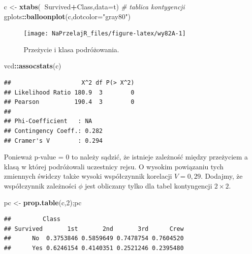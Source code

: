 \documentclass[polish,]{book}
\newenvironment{Shaded}{\begin{snugshade}}{\end{snugshade}}
\newcommand{\CommentTok}[1]{\textcolor[rgb]{0.56,0.35,0.01}{\textit{#1}}}
\newcommand{\DataTypeTok}[1]{\textcolor[rgb]{0.13,0.29,0.53}{#1}}
\newcommand{\DecValTok}[1]{\textcolor[rgb]{0.00,0.00,0.81}{#1}}
\newcommand{\KeywordTok}[1]{\textcolor[rgb]{0.13,0.29,0.53}{\textbf{#1}}}
\newcommand{\NormalTok}[1]{#1}
\newcommand{\OperatorTok}[1]{\textcolor[rgb]{0.81,0.36,0.00}{\textbf{#1}}}
\newcommand{\StringTok}[1]{\textcolor[rgb]{0.31,0.60,0.02}{#1}}
\begin{document}
\begin{Shaded}
\begin{Highlighting}[]
\NormalTok{c <-}\StringTok{ }\KeywordTok{xtabs}\NormalTok{(}\OperatorTok{~}\NormalTok{Survived}\OperatorTok{+}\NormalTok{Class,}\DataTypeTok{data=}\NormalTok{t) }\CommentTok{# tablica kontygencji}
\NormalTok{gplots}\OperatorTok{::}\KeywordTok{balloonplot}\NormalTok{(c,}\DataTypeTok{dotcolor=}\StringTok{"gray80"}\NormalTok{)}
\end{Highlighting}
\end{Shaded}

\begin{figure}[h]

{\centering \texttt{[image: NaPrzelajR\_files/figure-latex/wy82A-1]} 

}

\caption{Przeżycie i klasa podróżowania.}\label{fig:wy82A}
\end{figure}

\begin{Shaded}
\begin{Highlighting}[]
\NormalTok{vcd}\OperatorTok{::}\KeywordTok{assocstats}\NormalTok{(c)}
\end{Highlighting}
\end{Shaded}

\begin{verbatim}
##                    X^2 df P(> X^2)
## Likelihood Ratio 180.9  3        0
## Pearson          190.4  3        0
## 
## Phi-Coefficient   : NA 
## Contingency Coeff.: 0.282 
## Cramer's V        : 0.294
\end{verbatim}

Ponieważ p-value = 0 to należy sądzić, że istnieje zależność między przeżyciem a
klasą w której podróżowali uczestnicy rejsu. O wysokim powiązaniu tych zmiennych
świdczy także wysoki współczynnik korelacji \(V = 0,29\). Dodajmy, że współczynnik zależności \(\phi\) jest obliczany tylko dla tabel kontyngencji \(2\times2\).

\begin{Shaded}
\begin{Highlighting}[]
\NormalTok{pc <-}\StringTok{ }\KeywordTok{prop.table}\NormalTok{(c,}\DecValTok{2}\NormalTok{);pc}
\end{Highlighting}
\end{Shaded}

\begin{verbatim}
##         Class
## Survived       1st       2nd       3rd      Crew
##      No  0.3753846 0.5859649 0.7478754 0.7604520
##      Yes 0.6246154 0.4140351 0.2521246 0.2395480
\end{verbatim}
\end{document}
